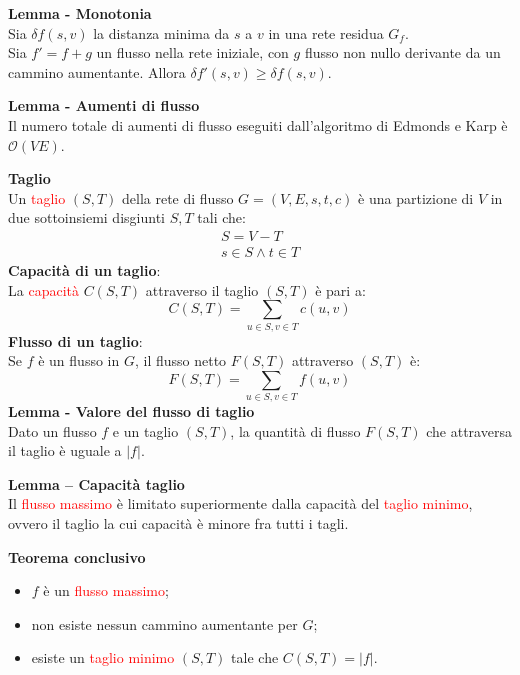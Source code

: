 \documentclass[../cheatSheetAlgoritmi.tex]{subfiles}
\begin{document}
\bigskip
\textbf{Lemma - Monotonia} \\
Sia $\delta f(s,v)$ la distanza minima da $s$ a $v$ in una rete residua $G_f$. \\Sia $f'=f+g$ un flusso nella rete iniziale, con $g$ flusso non nullo derivante da un cammino aumentante. Allora $\delta f'(s,v)\geq \delta f(s,v)$.

\bigskip
\textbf{Lemma - Aumenti di flusso} \\
Il numero totale di aumenti di flusso eseguiti dall'algoritmo di Edmonds e Karp è $\mathcal{O}(V E)$.

\bigskip
\textbf{Taglio} \\
Un \textcolor{red}{taglio} $(S,T)$ della rete di flusso $G= (V, E, s, t, c)$ è una partizione di $V$ in due sottoinsiemi disgiunti $S, T$ tali che: 
\begin{align*}
  	S = V - T \\
  	s \in S \land t \in T
\end{align*}
\textbf{Capacità di un taglio}: \\
La \textcolor{red}{capacità} $C(S, T)$ attraverso il taglio $(S,T)$ è pari a:
\begin{equation*}
  	C(S, T) = \sum_{u \in S, v \in T} c(u, v)
\end{equation*}
\textbf{Flusso di un taglio}: \\
Se $f$ è un flusso in $G$, il flusso netto $F(S,T)$ attraverso $(S,T)$ è: 
\begin{equation*}
  	F(S,T) = \sum_{u \in S, v \in T}f(u,v)
\end{equation*}
\textbf{Lemma - Valore del flusso di taglio} \\
Dato un flusso $f$ e un taglio $(S,T)$, la quantità di flusso $F(S,T)$ che attraversa il taglio è uguale a $|f|$. 

\bigskip
\textbf{Lemma – Capacità taglio} \\
Il \textcolor{red}{flusso massimo} è limitato superiormente dalla capacità del \textcolor{red}{taglio minimo}, ovvero il taglio la cui capacità è minore fra tutti i tagli.

\bigskip
\textbf{Teorema conclusivo}
\begin{itemize}
	\item $f$ è un \textcolor{red}{flusso massimo};
	\item non esiste nessun cammino aumentante per $G$;
	\item esiste un \textcolor{red}{taglio minimo} $(S, T)$ tale che $C(S, T) = |f|$.
\end{itemize}
\end{document}
